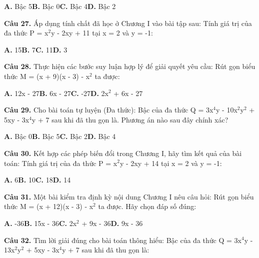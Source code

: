 \documentclass[11pt,a4paper]{article}
\begin{document}
\hspace*{1.5em}\textbf{A.} Bậc 5\quad\quad \textbf{B.} Bậc 0\quad\quad \textbf{C.} Bậc 4\quad\quad \textbf{D.} Bậc 2\par\vspace{2pt}
\textbf{\color{primary} Câu 27.} Áp dụng tính chất đã học ở Chương I vào bài tập sau: Tính giá trị của đa thức P = x$^2$y - 2xy + 11 tại x = 2 và y = -1:\par
\hspace*{1.5em}\textbf{A.} 15\quad\quad \textbf{B.} 7\quad\quad \textbf{C.} 11\quad\quad \textbf{D.} 3\par\vspace{2pt}
\textbf{\color{primary} Câu 28.} Thực hiện các bước suy luận hợp lý để giải quyết yêu cầu: Rút gọn biểu thức M = (x + 9)(x - 3) - x$^2$ ta được:\par
\hspace*{1.5em}\textbf{A.} 12x - 27\quad\quad \textbf{B.} 6x - 27\quad\quad \textbf{C.} -27\quad\quad \textbf{D.} 2x$^2$ + 6x - 27\par\vspace{2pt}
\textbf{\color{primary} Câu 29.} Cho bài toán tự luyện (Đa thức): Bậc của đa thức Q = 3x$^4$y - 10x$^2$y$^2$ + 5xy - 3x$^4$y + 7 sau khi đã thu gọn là. Phương án nào sau đây chính xác?\par
\hspace*{1.5em}\textbf{A.} Bậc 0\quad\quad \textbf{B.} Bậc 5\quad\quad \textbf{C.} Bậc 2\quad\quad \textbf{D.} Bậc 4\par\vspace{2pt}
\textbf{\color{primary} Câu 30.} Kết hợp các phép biến đổi trong Chương I, hãy tìm kết quả của bài toán: Tính giá trị của đa thức P = x$^2$y - 2xy + 14 tại x = 2 và y = -1:\par
\hspace*{1.5em}\textbf{A.} 6\quad\quad \textbf{B.} 10\quad\quad \textbf{C.} 18\quad\quad \textbf{D.} 14\par\vspace{2pt}
\textbf{\color{primary} Câu 31.} Một bài kiểm tra định kỳ nội dung Chương I nêu câu hỏi: Rút gọn biểu thức M = (x + 12)(x - 3) - x$^2$ ta được. Hãy chọn đáp số đúng:\par
\hspace*{1.5em}\textbf{A.} -36\quad\quad \textbf{B.} 15x - 36\quad\quad \textbf{C.} 2x$^2$ + 9x - 36\quad\quad \textbf{D.} 9x - 36\par\vspace{2pt}
\textbf{\color{primary} Câu 32.} Tìm lời giải đúng cho bài toán thông hiểu: Bậc của đa thức Q = 3x$^4$y - 13x$^2$y$^2$ + 5xy - 3x$^4$y + 7 sau khi đã thu gọn là:\par
\end{document}

